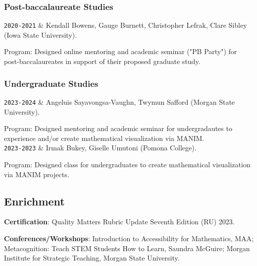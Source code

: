 \documentclass[11pt]{article}
\newcommand{\MSU}{Morgan State University}
\newcommand{\ISU}{Iowa State University}
\newcommand{\Pomona}{Pomona College}
\newcommand{\Duration}[2]{\fontsize{10pt}{0}\selectfont \texttt{#1-#2}}
\begin{document}
\vspace{-0.3cm}
    \subsubsection{Post-baccalaureate Studies}
\vspace{-0.3cm}

\begin{EntriesTableDuration}

\Duration{2020}{2021} & Kendall Bowens, Gauge Burnett, Christopher Lefrak, Clare Sibley (\ISU).

Program: Designed online mentoring and academic seminar ("PB Party") for post-baccalaureates in support of their proposed graduate study.

\end{EntriesTableDuration}
\vspace{-0.3cm}
    \subsubsection{Undergraduate Studies}
\vspace{-0.3cm}

\begin{EntriesTableDuration}

\Duration{2023}{2024} & Angeluis Sayavongsa-Vaughn, Twymun Safford (\MSU).

Program: Designed mentoring and academic seminar for undergradautes to experience and/or create mathematical visualization via MANIM.\\

\Duration{2023}{2023} & Irmak Bukey, Giselle Umutoni (\Pomona).

Program: Designed class for undergraduates to create mathematical visualization via MANIM projects.
\end{EntriesTableDuration}
\subsection{Enrichment}
\textbf{Certification}: Quality Matters Rubric Update Seventh Edition (RU) 2023.

\textbf{Conferences/Workshops}: Introduction to Accessibility for Mathematics, MAA; Metacognition: Teach STEM Students How to Learn, Saundra McGuire; Morgan Institute for Strategic Teaching, \MSU.

\end{document}
